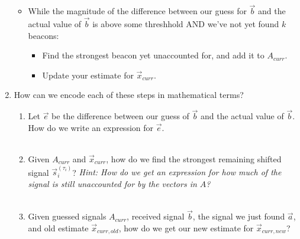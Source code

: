 \begin{enumerate}
\begin{itemize}
        \item While the magnitude of the difference between our guess for $\vec{b}$ and the actual value of $\vec{b}$ is
        above some threshhold AND we've not yet found $k$ beacons:
        \begin{itemize}
            \item Find the strongest beacon yet unaccounted for, and add it to $A_{curr}$.
            \item Update your estimate for $\vec{x}_{curr}$.
        \end{itemize}
    \end{itemize}

    \item How can we encode each of these steps in mathematical terms?
    \begin{enumerate}
        \item Let $\vec{e}$ be the difference between our guess of $\vec{b}$ and the actual value of $\vec{b}$.
        How do we write an expression for $\vec{e}$.
        \\ \\
        \item Given $A_{curr}$ and $\vec{x}_{curr}$, how do we find the strongest remaining shifted signal $\vec{s}_i^{(\tau_i)}$?
        \textit{Hint: How do we get an expression for how much of the signal is still unaccounted for by the vectors in $A$?}
        \\ \\
        \item Given guessed signals $A_{curr}$, received signal $\vec{b}$, the signal we just found $\vec{a}$, and old estimate
        $\vec{x}_{curr, old}$, how do we get our new estimate for $\vec{x}_{curr, new}$?
        \\ \\
        \sol{
}
\end{enumerate}
\end{enumerate}

